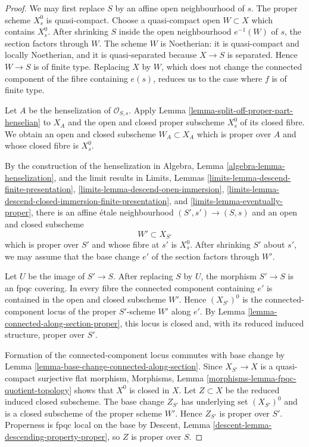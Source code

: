 \begin{proof}
We may first replace $S$ by an affine open neighbourhood of $s$.
The proper scheme $X_s^0$ is quasi-compact. Choose a quasi-compact open
$W\subset X$ which contains $X_s^0$. After shrinking $S$ inside the open
neighbourhood $e^{-1}(W)$ of $s$, the section factors through $W$. The scheme
$W$ is Noetherian: it is quasi-compact and locally Noetherian, and it is
quasi-separated because $X\to S$ is separated. Hence $W\to S$ is of finite
type. Replacing $X$ by $W$, which does not change the connected component of
the fibre containing $e(s)$, reduces us to the case where $f$ is of finite
type.

Let $A$ be the henselization of $\mathcal{O}_{S, s}$. Apply
Lemma \ref{lemma-split-off-proper-part-henselian} to $X_A$ and the open and
closed proper subscheme $X_s^0$ of its closed fibre. We obtain an open and
closed subscheme $W_A \subset X_A$ which is proper over $A$ and whose closed
fibre is $X_s^0$.

By the construction of the henselization in Algebra, Lemma
\ref{algebra-lemma-henselization}, and the limit results in Limits, Lemmas
\ref{limits-lemma-descend-finite-presentation},
\ref{limits-lemma-descend-open-immersion},
\ref{limits-lemma-descend-closed-immersion-finite-presentation}, and
\ref{limits-lemma-eventually-proper}, there is an affine \'etale
neighbourhood $(S', s') \to (S, s)$ and an open and closed subscheme
$$
W' \subset X_{S'}
$$
which is proper over $S'$ and whose fibre at $s'$ is $X_s^0$. After
shrinking $S'$ about $s'$, we may assume that the base change $e'$ of the
section factors through $W'$.

Let $U$ be the image of $S' \to S$. After replacing $S$ by $U$, the morphism
$S' \to S$ is an fpqc covering. In every fibre the connected component
containing $e'$ is contained in the open and closed subscheme $W'$. Hence
$(X_{S'})^0$ is the connected-component locus of the proper $S'$-scheme
$W'$ along $e'$. By
Lemma \ref{lemma-connected-along-section-proper}, this locus is closed and,
with its reduced induced structure, proper over $S'$.

Formation of the connected-component locus commutes with base change by
Lemma \ref{lemma-base-change-connected-along-section}. Since
$X_{S'} \to X$ is a quasi-compact surjective flat morphism, Morphisms,
Lemma \ref{morphisms-lemma-fpqc-quotient-topology} shows that $X^0$ is closed
in $X$. Let $Z \subset X$ be the reduced induced closed subscheme. The base
change $Z_{S'}$ has underlying set $(X_{S'})^0$ and is a closed subscheme of
the proper scheme $W'$. Hence $Z_{S'}$ is proper over $S'$. Properness is
fpqc local on the base by Descent, Lemma
\ref{descent-lemma-descending-property-proper}, so $Z$ is proper over $S$.
\end{proof}

